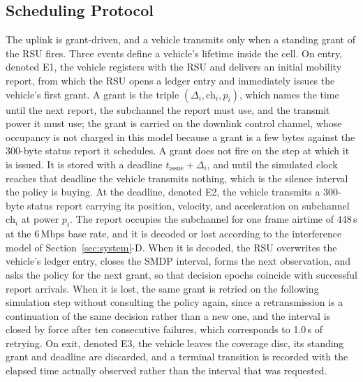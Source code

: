 \documentclass[journal]{IEEEtran}
\begin{document}
\subsection{Scheduling Protocol}
The uplink is grant-driven, and a vehicle transmits only when a standing grant of the RSU fires. Three events define a vehicle's lifetime inside the cell. On entry, denoted E1, the vehicle registers with the RSU and delivers an initial mobility report, from which the RSU opens a ledger entry and immediately issues the vehicle's first grant. A grant is the triple $(\Delta_i, \mathrm{ch}_i, p_i)$, which names the time until the next report, the subchannel the report must use, and the transmit power it must use; the grant is carried on the downlink control channel, whose occupancy is not charged in this model because a grant is a few bytes against the 300-byte status report it schedules. A grant does not fire on the step at which it is issued. It is stored with a deadline $t_{\mathrm{issue}} + \Delta_i$, and until the simulated clock reaches that deadline the vehicle transmits nothing, which is the silence interval the policy is buying. At the deadline, denoted E2, the vehicle transmits a 300-byte status report carrying its position, velocity, and acceleration on subchannel $\mathrm{ch}_i$ at power $p_i$. The report occupies the subchannel for one frame airtime of 448\,\textmu s at the 6\,Mbps base rate, and it is decoded or lost according to the interference model of Section~\ref{sec:system}-D. When it is decoded, the RSU overwrites the vehicle's ledger entry, closes the SMDP interval, forms the next observation, and asks the policy for the next grant, so that decision epochs coincide with successful report arrivals. When it is lost, the same grant is retried on the following simulation step without consulting the policy again, since a retransmission is a continuation of the same decision rather than a new one, and the interval is closed by force after ten consecutive failures, which corresponds to 1.0\,s of retrying. On exit, denoted E3, the vehicle leaves the coverage disc, its standing grant and deadline are discarded, and a terminal transition is recorded with the elapsed time actually observed rather than the interval that was requested.
\end{document}
